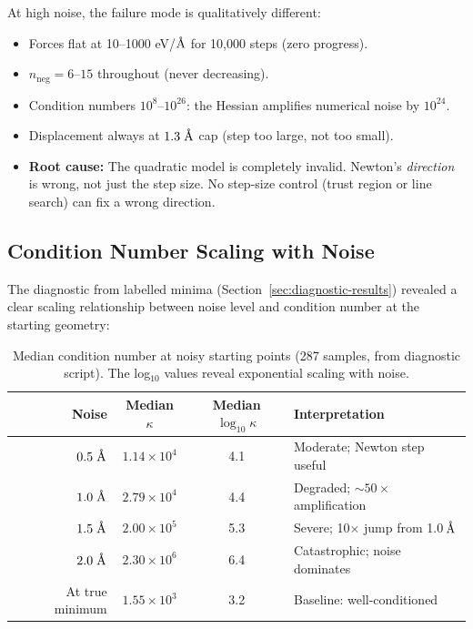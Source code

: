 \documentclass[11pt,a4paper]{article}
\newcommand{\angstrom}{\text{\r{A}}}
\begin{document}
At high noise, the failure mode is qualitatively different:
\begin{itemize}
  \item Forces flat at 10--1000 eV/$\angstrom$ for 10,000 steps (zero progress).
  \item $n_\text{neg} = 6$--$15$ throughout (never decreasing).
  \item Condition numbers $10^8$--$10^{26}$: the Hessian amplifies numerical noise by $10^{24}$.
  \item Displacement always at $1.3\;\angstrom$ cap (step too large, not too small).
  \item \textbf{Root cause:} The quadratic model is completely invalid. Newton's \emph{direction} is wrong, not just the step size. No step-size control (trust region or line search) can fix a wrong direction.
\end{itemize}

\subsection{Condition Number Scaling with Noise}
\label{sec:cond-scaling}

The diagnostic from labelled minima (Section~\ref{sec:diagnostic-results}) revealed a clear scaling relationship between noise level and condition number at the starting geometry:

\begin{table}[H]
\centering
\caption{Median condition number at noisy starting points (287 samples, from diagnostic script). The log$_{10}$ values reveal exponential scaling with noise.}
\label{tab:cond-scaling}
\begin{tabular}{rccl}
\toprule
Noise & Median $\kappa$ & Median $\log_{10}\kappa$ & Interpretation \\
\midrule
$0.5\;\angstrom$ & $1.14 \times 10^4$ & 4.1 & Moderate; Newton step useful \\
$1.0\;\angstrom$ & $2.79 \times 10^4$ & 4.4 & Degraded; $\sim\!50\times$ amplification \\
$1.5\;\angstrom$ & $2.00 \times 10^5$ & 5.3 & Severe; 10$\times$ jump from 1.0\,$\angstrom$ \\
$2.0\;\angstrom$ & $2.30 \times 10^6$ & 6.4 & Catastrophic; noise dominates \\
\midrule
At true minimum & $1.55 \times 10^3$ & 3.2 & Baseline: well-conditioned \\
\bottomrule
\end{tabular}
\end{table}
\end{document}
